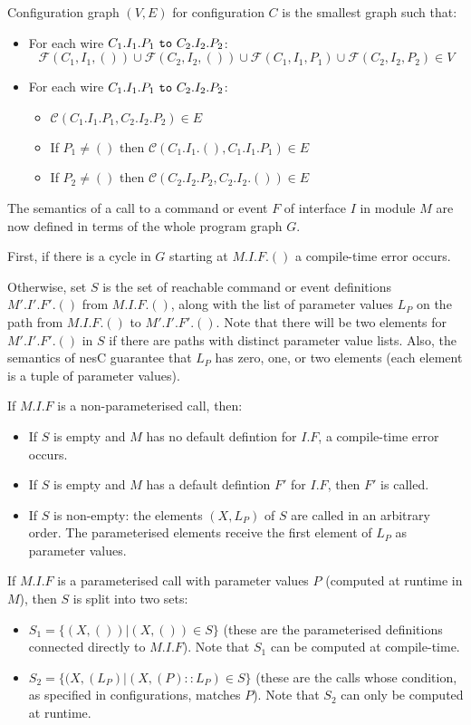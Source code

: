 \documentclass[11pt]{article}
\newcommand{\kw}[1]{{\tt #1}}
\newcommand{\nesc}{nesC\xspace}
\newcommand{\FSE}{\mathcal{F}}
\newcommand{\connect}{\mathcal{C}}
\begin{document}
Configuration graph $(V,E)$ for configuration $C$ is the smallest graph
such that:
\begin{itemize}
\item For each wire $C_1.I_1.P_1 \kw{\ to\ } C_2.I_2.P_2$:
$$\FSE(C_1, I_1, ()) \cup \FSE(C_2, I_2, ()) \cup \FSE(C_1, I_1, P_1) \cup
\FSE(C_2, I_2, P_2) \in V$$

\item For each wire $C_1.I_1.P_1 \kw{\ to\ } C_2.I_2.P_2$:
\begin{itemize}
\item $\connect(C_1.I_1.P_1, C_2.I_2.P_2) \in E$
\item If $P_1 \not= ()$ then $\connect(C_1.I_1.(), C_1.I_1.P_1) \in E$
\item If $P_2 \not= ()$ then $\connect(C_2.I_2.P_2, C_2.I_2.()) \in E$
\end{itemize}
\end{itemize}

The semantics of a call to a command or event $F$ of interface $I$ in
module $M$ are now defined in terms of the whole program graph $G$.

First, if there is a cycle in $G$ starting at $M.I.F.()$ a compile-time
error occurs.

Otherwise, set $S$ is the set of reachable command or event definitions
$M'.I'.F'.()$ from $M.I.F.()$, along with the list of parameter values
$L_P$ on the path from $M.I.F.()$ to $M'.I'.F'.()$. Note that there will be
two elements for $M'.I'.F'.()$ in $S$ if there are paths with distinct
parameter value lists. Also, the semantics of \nesc guarantee that $L_P$
has zero, one, or two elements (each element is a tuple of parameter
values).

If $M.I.F$ is a non-parameterised call, then:
\begin{itemize}
\item If $S$ is empty and $M$ has no default defintion for $I.F$, a
compile-time error occurs.
\item If $S$ is empty and $M$ has a default defintion $F'$ for $I.F$, then
$F'$ is called.
\item If $S$ is non-empty: the elements $(X, L_P)$ of $S$ are
called in an arbitrary order. The parameterised elements receive
the first element of $L_P$ as parameter values.
\end{itemize}

If $M.I.F$ is a parameterised call with parameter values $P$ (computed at
runtime in $M$), then $S$ is split into two sets: 
\begin{itemize}
\item $S_1 = \{ (X, ()) | (X, ()) \in S \}$ (these are the parameterised
definitions connected directly to $M.I.F$). Note that $S_1$ can be computed
at compile-time.
\item $S_2 = \{ (X, (L_P) | (X, (P) :: L_P) \in S \}$ (these are the calls
whose condition, as specified in configurations, matches $P$). Note that
$S_2$ can only be computed at runtime.
\end{itemize}
\end{document}
